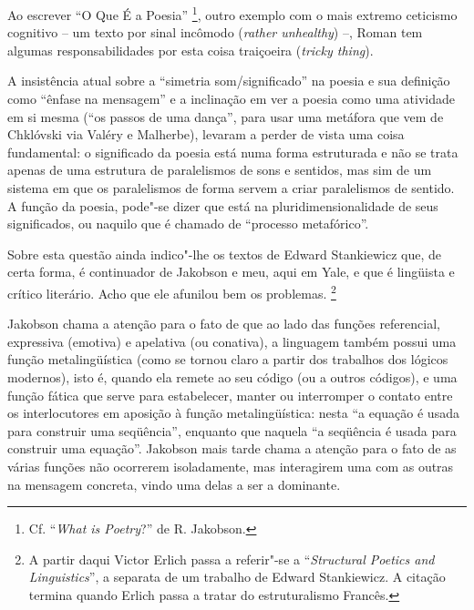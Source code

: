 Ao escrever ``O Que É a Poesia'' \footnote{Cf. ``\emph{What is
  Poetry}?'' de R. Jakobson.}, outro exemplo com o mais extremo
ceticismo cognitivo -- um texto por sinal incômodo (\emph{rather
unhealthy}) --, Roman tem algumas responsabilidades por esta coisa
traiçoeira (\emph{tricky thing}).

A insistência atual sobre a ``simetria som/significado'' na poesia e sua
definição como ``ênfase na mensagem'' e a inclinação em ver a poesia
como uma atividade em si mesma (``os passos de uma dança'', para usar
uma metáfora que vem de Chklóvski via Valéry e Malherbe), levaram a
perder de vista uma coisa fundamental: o significado da poesia está numa
forma estruturada e não se trata apenas de uma estrutura de paralelismos
de sons e sentidos, mas sim de um sistema em que os paralelismos de
forma servem a criar paralelismos de sentido. A função da poesia,
pode"-se dizer que está na pluridimensionalidade de seus significados, ou
naquilo que é chamado de ``processo metafórico''.

Sobre esta questão ainda indico"-lhe os textos de Edward Stankiewicz que,
de certa forma, é continuador de Jakobson e meu, aqui em Yale, e que é
lingüista e crítico literário. Acho que ele afunilou bem os problemas.
\footnote{A partir daqui Victor Erlich passa a referir"-se a
  ``\emph{Structural Poetics and Linguistics}'', a separata de um
  trabalho de Edward Stankiewicz. A citação termina quando Erlich passa
  a tratar do estruturalismo Francês.}

Jakobson chama a atenção para o fato de que ao lado das funções
referencial, expressiva (emotiva) e apelativa (ou conativa), a linguagem
também possui uma função metalingüística (como se tornou claro a partir
dos trabalhos dos lógicos modernos), isto é, quando ela remete ao seu
código (ou a outros códigos), e uma função fática que serve para
estabelecer, manter ou interromper o contato entre os interlocutores em
aposição à função metalingüística: nesta ``a equação é usada para
construir uma seqüência'', enquanto que naquela ``a seqüência é usada
para construir uma equação''. Jakobson mais tarde chama a atenção para o
fato de as várias funções não ocorrerem isoladamente, mas interagirem
uma com as outras na mensagem concreta, vindo uma delas a ser a
dominante.

